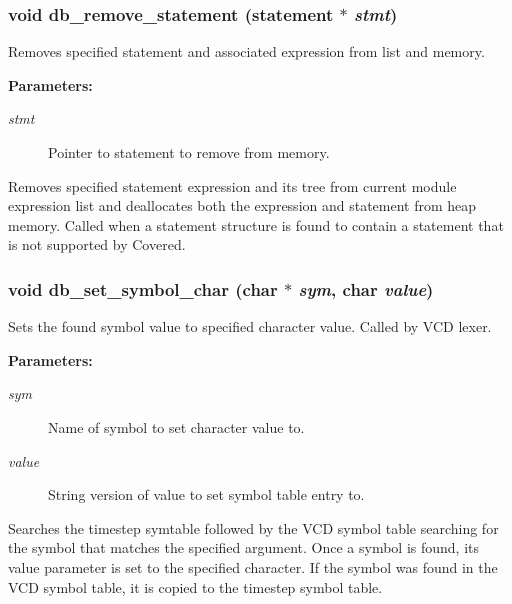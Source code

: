 \subsubsection{\setlength{\rightskip}{0pt plus 5cm}void db\_\-remove\_\-statement ({\bf statement} $\ast$ {\em stmt})}\label{db_8c_a32}


Removes specified statement and associated expression from list and memory.

\begin{Desc}
\item[{\bf Parameters: }]\par
\begin{description}
\item[
{\em stmt}]Pointer to statement to remove from memory.

\end{description}
\end{Desc}
Removes specified statement expression and its tree from current module expression list and deallocates both the expression and statement from heap memory. Called when a statement structure is found to contain a statement that is not supported by Covered. 
\subsubsection{\setlength{\rightskip}{0pt plus 5cm}void db\_\-set\_\-symbol\_\-char (char $\ast$ {\em sym}, char {\em value})}\label{db_8c_a40}


Sets the found symbol value to specified character value. Called by VCD lexer.

\begin{Desc}
\item[{\bf Parameters: }]\par
\begin{description}
\item[
{\em sym}]Name of symbol to set character value to. \item[
{\em value}]String version of value to set symbol table entry to.

\end{description}
\end{Desc}
Searches the timestep symtable followed by the VCD symbol table searching for the symbol that matches the specified argument. Once a symbol is found, its value parameter is set to the specified character. If the symbol was found in the VCD symbol table, it is copied to the timestep symbol table. 
